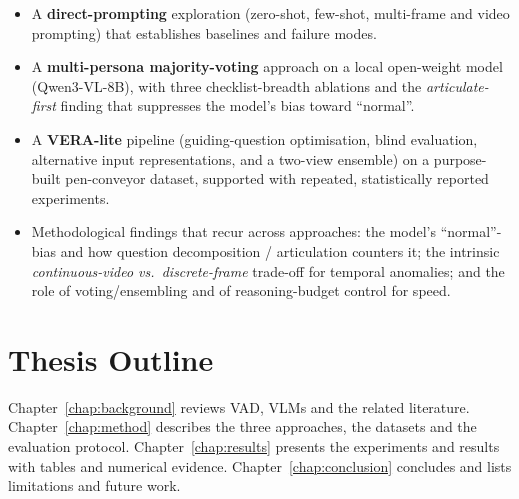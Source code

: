 \begin{itemize}
  \item A \textbf{direct-prompting} exploration (zero-shot, few-shot, multi-frame and
        video prompting) that establishes baselines and failure modes.
  \item A \textbf{multi-persona majority-voting} approach on a local open-weight model
        (Qwen3-VL-8B), with three checklist-breadth ablations and the
        \emph{articulate-first} finding that suppresses the model's bias toward
        ``normal''.
  \item A \textbf{VERA-lite} pipeline (guiding-question optimisation, blind evaluation,
        alternative input representations, and a two-view ensemble) on a purpose-built
        pen-conveyor dataset, supported with repeated, statistically reported
        experiments.
  \item Methodological findings that recur across approaches: the model's
        ``normal''-bias and how question decomposition / articulation counters it;
        the intrinsic \emph{continuous-video vs.\ discrete-frame} trade-off for temporal
        anomalies; and the role of voting/ensembling and of reasoning-budget control
        for speed.
\end{itemize}

\section{Thesis Outline}
Chapter~\ref{chap:background} reviews VAD, VLMs and the related literature.
Chapter~\ref{chap:method} describes the three approaches, the datasets and the
evaluation protocol. Chapter~\ref{chap:results} presents the experiments and results
with tables and numerical evidence. Chapter~\ref{chap:conclusion} concludes and lists
limitations and future work.
